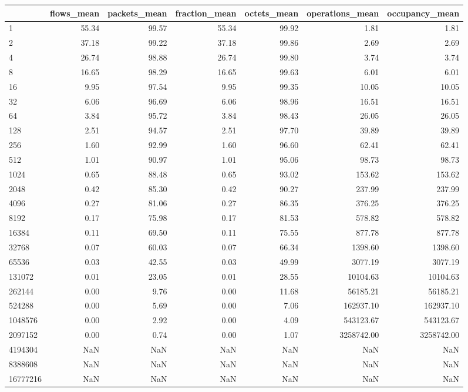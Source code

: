 \begin{tabular}{lrrrrrr}
\toprule
 & flows_mean & packets_mean & fraction_mean & octets_mean & operations_mean & occupancy_mean \\
\midrule
1 & 55.34 & 99.57 & 55.34 & 99.92 & 1.81 & 1.81 \\
2 & 37.18 & 99.22 & 37.18 & 99.86 & 2.69 & 2.69 \\
4 & 26.74 & 98.88 & 26.74 & 99.80 & 3.74 & 3.74 \\
8 & 16.65 & 98.29 & 16.65 & 99.63 & 6.01 & 6.01 \\
16 & 9.95 & 97.54 & 9.95 & 99.35 & 10.05 & 10.05 \\
32 & 6.06 & 96.69 & 6.06 & 98.96 & 16.51 & 16.51 \\
64 & 3.84 & 95.72 & 3.84 & 98.43 & 26.05 & 26.05 \\
128 & 2.51 & 94.57 & 2.51 & 97.70 & 39.89 & 39.89 \\
256 & 1.60 & 92.99 & 1.60 & 96.60 & 62.41 & 62.41 \\
512 & 1.01 & 90.97 & 1.01 & 95.06 & 98.73 & 98.73 \\
1024 & 0.65 & 88.48 & 0.65 & 93.02 & 153.62 & 153.62 \\
2048 & 0.42 & 85.30 & 0.42 & 90.27 & 237.99 & 237.99 \\
4096 & 0.27 & 81.06 & 0.27 & 86.35 & 376.25 & 376.25 \\
8192 & 0.17 & 75.98 & 0.17 & 81.53 & 578.82 & 578.82 \\
16384 & 0.11 & 69.50 & 0.11 & 75.55 & 877.78 & 877.78 \\
32768 & 0.07 & 60.03 & 0.07 & 66.34 & 1398.60 & 1398.60 \\
65536 & 0.03 & 42.55 & 0.03 & 49.99 & 3077.19 & 3077.19 \\
131072 & 0.01 & 23.05 & 0.01 & 28.55 & 10104.63 & 10104.63 \\
262144 & 0.00 & 9.76 & 0.00 & 11.68 & 56185.21 & 56185.21 \\
524288 & 0.00 & 5.69 & 0.00 & 7.06 & 162937.10 & 162937.10 \\
1048576 & 0.00 & 2.92 & 0.00 & 4.09 & 543123.67 & 543123.67 \\
2097152 & 0.00 & 0.74 & 0.00 & 1.07 & 3258742.00 & 3258742.00 \\
4194304 & NaN & NaN & NaN & NaN & NaN & NaN \\
8388608 & NaN & NaN & NaN & NaN & NaN & NaN \\
16777216 & NaN & NaN & NaN & NaN & NaN & NaN \\
\bottomrule
\end{tabular}
